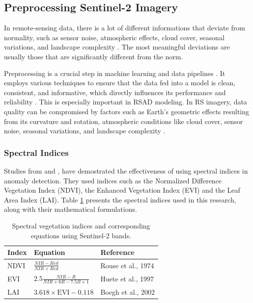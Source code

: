 \documentclass{article} %
\begin{document}
    \subsection{Preprocessing Sentinel-2 Imagery}
        In remote-sensing data, there is a lot of different informations that deviate from normality, such as sensor noise, atmospheric effects, cloud cover, seasonal variations, and landscape complexity \citep{fu2025lightweight}. The most meaningful deviations are usually those that are significantly different from the norm.

        Preprocessing is a crucial step in machine learning and data pipelines \citep{tawakuli2025survey}. It employs various techniques to ensure that the data fed into a model is clean, consistent, and informative, which directly influences its performance and reliability \citep{zheng2021improved}. This is especially important in RSAD modeling. In RS imagery, data quality can be compromised by factors such as Earth's geometric effects resulting from its curvature and rotation, atmospheric conditions like cloud cover, sensor noise, seasonal variations, and landscape complexity \citep{fu2025lightweight}.

        \subsubsection{Spectral Indices}

            Studies from \cite{bilintoh2019remote} and \cite{prabhakar2022detecting}, have demostrated the effectiveness of using spectral indices in anomaly detection. They used indices such as the Normalized Difference Vegetation Index (NDVI), the Enhanced Vegetation Index (EVI) and the Leaf Area Index (LAI). Table \ref{tab:veg_indices} presents the spectral indices used in this research, along with their mathematical formulations.

            \begin{table}[ht]
            \centering
            \caption{Spectral vegetation indices and corresponding equations using Sentinel-2 bands.}
            \label{tab:veg_indices}
            \renewcommand{\arraystretch}{1.4}
            \small
                \begin{tabular}{p{3cm} p{3cm} p{3cm}}
                \textbf{Index} & \textbf{Equation} & \textbf{Reference} \\
                \hline
                NDVI & 
                $\frac{NIR - Red}{NIR + Red}$ & 
                Rouse et al., 1974 \\

                EVI & 
                $2.5 \frac{NIR - R}{NIR + 6R - 7.5B + 1}$ & 
                Huete et al., 1997 \\

                LAI &
                $3.618 \times \text{EVI} - 0.118$ & 
                Boegh et al., 2002 \\
                \end{tabular}
                
            \end{table}
            
\end{document}
